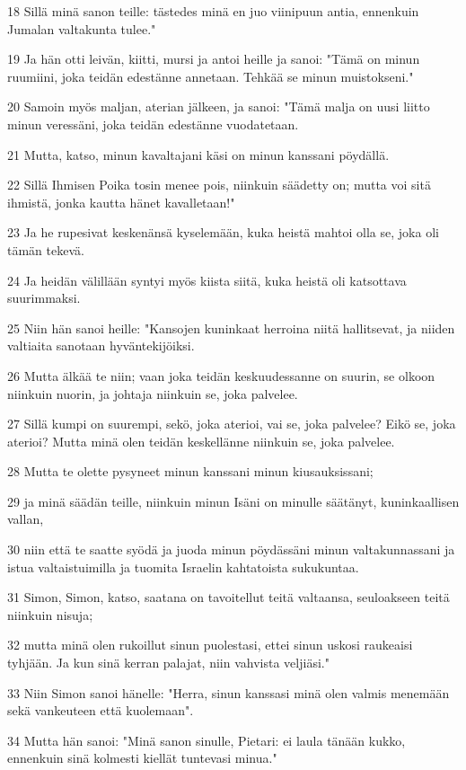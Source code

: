 \par 18 Sillä minä sanon teille: tästedes minä en juo viinipuun antia, ennenkuin Jumalan valtakunta tulee."
\par 19 Ja hän otti leivän, kiitti, mursi ja antoi heille ja sanoi: "Tämä on minun ruumiini, joka teidän edestänne annetaan. Tehkää se minun muistokseni."
\par 20 Samoin myös maljan, aterian jälkeen, ja sanoi: "Tämä malja on uusi liitto minun veressäni, joka teidän edestänne vuodatetaan.
\par 21 Mutta, katso, minun kavaltajani käsi on minun kanssani pöydällä.
\par 22 Sillä Ihmisen Poika tosin menee pois, niinkuin säädetty on; mutta voi sitä ihmistä, jonka kautta hänet kavalletaan!"
\par 23 Ja he rupesivat keskenänsä kyselemään, kuka heistä mahtoi olla se, joka oli tämän tekevä.
\par 24 Ja heidän välillään syntyi myös kiista siitä, kuka heistä oli katsottava suurimmaksi.
\par 25 Niin hän sanoi heille: "Kansojen kuninkaat herroina niitä hallitsevat, ja niiden valtiaita sanotaan hyväntekijöiksi.
\par 26 Mutta älkää te niin; vaan joka teidän keskuudessanne on suurin, se olkoon niinkuin nuorin, ja johtaja niinkuin se, joka palvelee.
\par 27 Sillä kumpi on suurempi, sekö, joka aterioi, vai se, joka palvelee? Eikö se, joka aterioi? Mutta minä olen teidän keskellänne niinkuin se, joka palvelee.
\par 28 Mutta te olette pysyneet minun kanssani minun kiusauksissani;
\par 29 ja minä säädän teille, niinkuin minun Isäni on minulle säätänyt, kuninkaallisen vallan,
\par 30 niin että te saatte syödä ja juoda minun pöydässäni minun valtakunnassani ja istua valtaistuimilla ja tuomita Israelin kahtatoista sukukuntaa.
\par 31 Simon, Simon, katso, saatana on tavoitellut teitä valtaansa, seuloakseen teitä niinkuin nisuja;
\par 32 mutta minä olen rukoillut sinun puolestasi, ettei sinun uskosi raukeaisi tyhjään. Ja kun sinä kerran palajat, niin vahvista veljiäsi."
\par 33 Niin Simon sanoi hänelle: "Herra, sinun kanssasi minä olen valmis menemään sekä vankeuteen että kuolemaan".
\par 34 Mutta hän sanoi: "Minä sanon sinulle, Pietari: ei laula tänään kukko, ennenkuin sinä kolmesti kiellät tuntevasi minua."
